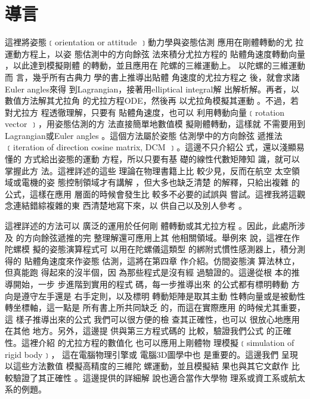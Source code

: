 \documentclass[12pt,twoside]{article}
\begin{document}
 

\part{導言\protect\bigskip}

這裡將姿態﹝orientation or attitude%
﹞動力學與姿態估測%
應用在剛體轉動的尤%
拉運動方程上，以姿%
態估測中的方向餘弦%
法來積分尤拉方程的%
貼體角速度轉動向量%
，以此達到模擬剛體%
的轉動，並且應用在%
陀螺的三維運動上。%
以陀螺的三維運動而%
言，幾乎所有古典力%
學的書上推導出貼體%
角速度的尤拉方程之%
後，就會求諸Euler angles來得%
到Lagrangian，接著用elliptical integral解%
出解析解。再者，以%
數值方法解其尤拉角%
的尤拉方程ODE，然後再%
以尤拉角模擬其運動%
。不過，若對尤拉方%
程透徹理解，只要有%
貼體角速度，也可以%
利用轉動向量﹝rotation vector%
﹞，用姿態估測的方%
法直接簡單地數值模%
擬剛體轉動，這樣就%
不需要用到Lagrangian或Euler angles%
。這個方法屬於姿態%
估測學中的方向餘弦%
遞推法﹝iteration of direction cosine matrix, DCM%
﹞。這邊不只介紹公%
式，還以淺顯易懂的%
方式給出姿態的運動%
方程，所以只要有基%
礎的線性代數矩陣知%
識，就可以掌握此方%
法。這裡詳述的這些%
理論在物理書籍上比%
較少見，反而在航空%
太空領域或電機的姿%
態控制領域才有講解%
，但大多也缺乏清楚%
的解釋，只給出複雜%
的公式，這樣在應用%
層面的時候會發生比%
較多不必要的試誤與%
嘗試。這裡我將這觀%
念連結錯綜複雜的東%
西清楚地寫下來，以%
供自己以及別人參考%
。

這裡詳述的方法可以%
廣泛的運用於任何剛%
體轉動或其尤拉方程%
。因此，此處所涉及%
的方向餘弦遞推的完%
整理解還可應用上其%
他相關領域。舉例來%
說，這裡在作陀螺模%
擬的姿態演算程式可%
以用在陀螺儀這類型%
的綁附式慣性感測器\cite%
[Ch 3.6.4]{titterton}上，積分測得的%
貼體角速度來作姿態%
估測，這將在第四章%
作介紹。仿間姿態演%
算法林立，但真能跑%
得起來的沒半個，因%
為那些程式是沒有經%
過驗證的。這邊從根%
本的推導開始，一步%
步進階到實用的程式%
碼，每一步推導出來%
的公式都有標明轉動%
方向是遵守左手還是%
右手定則，以及標明%
轉動矩陣是取其主動%
性轉向量或是被動性%
轉坐標軸，這一點是%
所有書上所共同缺乏%
的，而這在實際應用%
的時候尤其重要，這%
樣子推導出來的公式%
我們可以很方便的檢%
查其正確性，也可以%
很放心地應用在其他%
地方。另外，這邊提%
供與第三方程式碼的%
比較，驗證我們公式%
的正確性。這裡介紹%
的尤拉方程的數值化%
也可以應用上剛體物%
理模擬﹝simulation of rigid body﹞，%
這在電腦物理引擎或%
電腦3D圖學\cite[Ch 2.3]{pixarnote}中也%
是重要的。這邊我們%
呈現以這些方法數值%
模擬高精度的三維陀%
螺運動，並且模擬結%
果也與其它文獻\cite{hasbun}作%
比較驗證了其正確性%
。這邊提供的詳細解%
說也適合當作大學物%
理系或資工系或航太%
系的例題。
\end{document}
